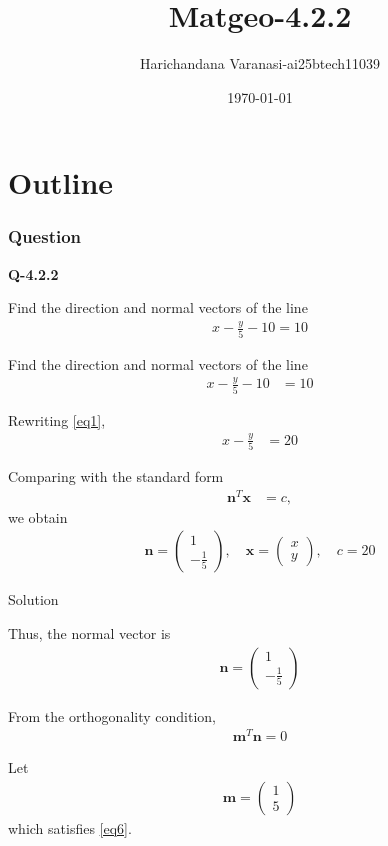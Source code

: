 \documentclass{beamer}
\title{Matgeo-4.2.2}
\author{Harichandana Varanasi-ai25btech11039}
\date{\today}
\theoremstyle{remark}
\newcommand{\myvec}[1]{\ensuremath{\begin{pmatrix}#1\end{pmatrix}}}
\let\vec\mathbf
\begin{document}
\begin{frame}
\titlepage
\end{frame}

\section*{Outline}

\begin{frame}
\frametitle{Question}

\textbf{Q-4.2.2} 

Find the direction and normal vectors of the line
\begin{align*}                 
    x - \frac{y}{5} - 10 = 10
\end{align*}




\end{frame}
%
\begin{frame}

\setcounter{equation}{0}
\renewcommand{\theequation}{\arabic{equation}}
Find the direction and normal vectors of the line
\begin{align}
    x - \frac{y}{5} - 10 &= 10
    \label{eq1}
\end{align}

Rewriting \eqref{eq1},
\begin{align}
    x - \frac{y}{5} &= 20
    \label{eq2}
\end{align}

Comparing with the standard form
\begin{align}
    \vec{n}^T\vec{x} &= c,
    \label{eq3}
\end{align}
we obtain
\begin{align}
    \vec{n} = \myvec{1 \\ -\tfrac{1}{5}}, \quad
    \vec{x} = \myvec{x \\ y}, \quad
    c = 20
    \label{eq4}
\end{align}



\end{frame}
\begin{frame}{Solution}


   Thus, the normal vector is
\begin{align}
    \vec{n} = \myvec{1 \\ -\tfrac{1}{5}}
    \label{eq5}
\end{align}

From the orthogonality condition,
\begin{align}
    \vec{m}^T\vec{n} = 0
    \label{eq6}
\end{align}

Let
\begin{align}
    \vec{m} = \myvec{1 \\ 5}
    \label{eq7}
\end{align}
which satisfies \eqref{eq6}.




\end{frame}
\end{document}
